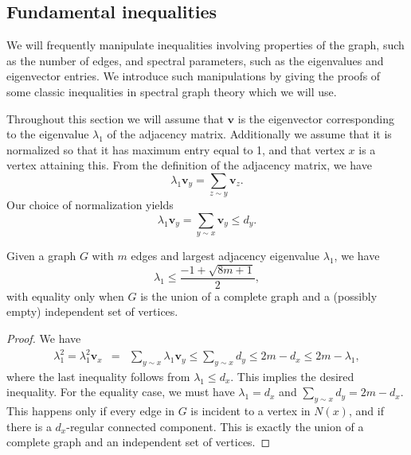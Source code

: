 \subsection{Fundamental inequalities}

We will frequently manipulate inequalities involving properties of the graph, such as the number
of edges, and spectral parameters, such as the eigenvalues and eigenvector entries.
We introduce such manipulations by giving the proofs of some classic inequalities in spectral graph
theory which we will use.


Throughout this section we will assume that $\mathbf{v}$ is the eigenvector
corresponding to the eigenvalue $\lambda_1$ of the adjacency matrix.  Additionally we assume that
it is normalized so that it has maximum entry equal to 1, and that vertex $x$ is a vertex attaining this.  From the definition of the adjacency matrix, we have
\begin{equation}\label{eigenvector equation}
  \lambda_1 \mathbf{v}_y = \sum_{z \sim y} \mathbf{v}_z .
\end{equation}
Our choice of normalization yields
\begin{equation}
  \lambda_1 \mathbf{v}_y = \sum_{y \sim x} \mathbf{v}_y\leq d_y .
\end{equation}


\begin{theorem}
  Given a graph $G$ with $m$ edges and largest adjacency eigenvalue $\lambda_1$, we have
  \[ \lambda_1 \leq \frac{-1 + \sqrt{8m + 1}}{2} ,\]
  with equality only when $G$ is the union of a complete graph and a (possibly empty) independent set of vertices.
\end{theorem}
\begin{proof}
  We have
  \begin{eqnarray*}
    \lambda_1^2 = \lambda_1^2 \mathbf{v}_x & = & \sum_{y \sim x} \lambda_1 \mathbf{v}_y \leq \sum_{y \sim x} d_y \leq 2m - d_x \leq 2m - \lambda_1, 
  \end{eqnarray*}
  where the last inequality follows from $\lambda_1 \leq d_x$.  This implies the desired inequality.  For the equality case, we must have
  $\lambda_1 = d_x$ and $\sum_{y \sim x} d_y = 2m - d_x$.  This happens only if every edge in $G$ is incident to a vertex in $N(x)$,
  and if there is a $d_x$-regular connected component.  This is exactly the union of a complete graph and an independent set of vertices. 
  
\end{proof}


